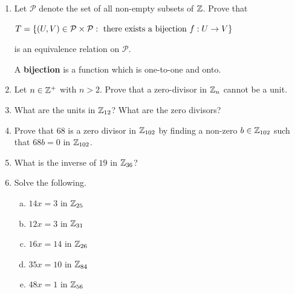\documentclass[11pt,fleqn,dvipsnames,usenames]{article}
\begin{document}
\begin{enumerate}
\item Let $\mathcal{P}$ denote the set of all non-empty subsets of $\mathbb{Z}$.  Prove that
\begin{center}
$T = \left\{(U,V)\in \mathcal{P}\times\mathcal{P}:\text{ there exists a bijection }f:U\to V\right\}$
\end{center}
is an equivalence relation on $\mathcal{P}$.
\vsmsp

\recall A \textbf{bijection} is a function which is one-to-one and onto.


\item Let $n\in\mathbb{Z}^+$ with $n > 2$.  Prove that a zero-divisor in $\mathbb{Z}_n$ cannot be a unit.
\item What are the units in $\mathbb{Z}_{12}$?  What are the zero divisors?
\item Prove that $68$ is a zero divisor in $\mathbb{Z}_{102}$ by finding a non-zero $b\in\mathbb{Z}_{102}$ such that $68b = 0$ in $\mathbb{Z}_{102}$.
\item What is the inverse of $19$ in $\mathbb{Z}_{36}$?
\item Solve the following.
\begin{enumerate}[(a)]
\item $14x = 3$ in $\mathbb{Z}_{25}$
\item $12x = 3$ in $\mathbb{Z}_{31}$
\item $16x = 14$ in $\mathbb{Z}_{26}$
\item $35x = 10$ in $\mathbb{Z}_{84}$
\item $48x = 1$ in $\mathbb{Z}_{56}$
\end{enumerate}
\end{enumerate}
\end{document}
